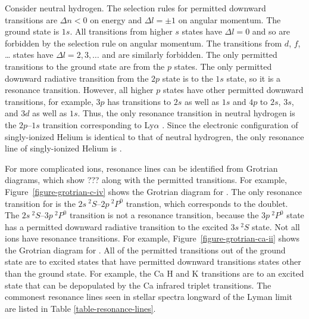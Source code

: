 Consider neutral hydrogen. The selection rules for permitted
downward transitions are $\Delta n < 0$ on energy and
$\Delta l = \pm 1$ on angular momentum. The ground state is
$1s$. All transitions from higher $s$ states have $\Delta l
= 0$ and so are forbidden by the selection rule on angular
momentum. The transitions from $d$, $f$, {\ldots} states
have $\Delta l = 2, 3, {\ldots}$ and are similarly
forbidden. The only permitted transitions to the ground
state are from the $p$ states. The only permitted downward
radiative transition from the $2p$ state is to the $1s$
state, so it is a resonance transition. However, all higher
$p$ states have other permitted downward transitions, for
example, $3p$ has transitions to $2s$ as well as $1s$ and
$4p$ to $2s$, $3s$, and $3d$ as well as $1s$. Thus, the only
resonance transition in neutral hydrogen is the $2p$--$1s$
transition corresponding to Ly$\alpha$ . Since
the electronic configuration of singly-ionized Helium is
identical to that of neutral hydrogren, the only resonance
line of singly-ionized Helium is .

For more complicated ions, resonance lines can be identified
from Grotrian diagrams, which show ??? along with the
permitted transitions. For example,
Figure~\ref{figure-grotrian-c-iv} shows the Grotrian diagram
for . The only resonance transition for
 is the $2s\:^2\!S$--$2p\:^2\!P^0$ transtion,
which corresponds to the  doublet. The
$2s\:^2\!S$--$3p\:^2\!P^0$ transition is not a resonance
transition, because the $3p\:^2\!P^0$ state has a permitted
downward radiative transition to the excited $3s\:^2\!S$
state. Not all ions have resonance transitions. For example,
Figure~\ref{figure-grotrian-ca-ii} shows the Grotrian
diagram for . All of the permitted transitions
out of the ground state are to excited states that have
permitted downward transitions states other than the ground
state. For example, the Ca H and K 
transitions are to an excited state that can be depopulated
by the Ca infrared triplet
 transitions. The commonest
resonance lines seen in stellar spectra longward of the
Lyman limit are listed in Table
\ref{table-resonance-lines}.

